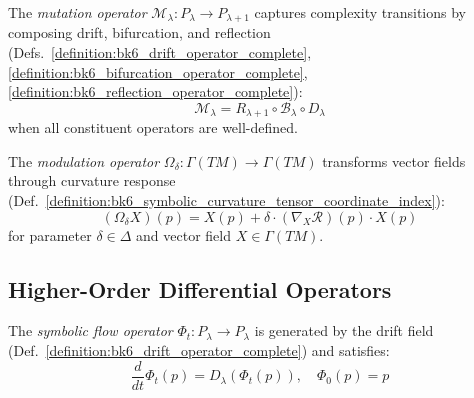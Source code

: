 \begin{definition}
\label{definition:bk6_mutation_operator_complete}
The \emph{mutation operator} $\mathcal{M}_{\lambda} : P_{\lambda} \to P_{\lambda+1}$ captures complexity transitions by composing drift, bifurcation, and reflection (Defs.~\ref{definition:bk6_drift_operator_complete}, \ref{definition:bk6_bifurcation_operator_complete}, \ref{definition:bk6_reflection_operator_complete}):
\begin{equation}
\mathcal{M}_{\lambda} = R_{\lambda+1} \circ \mathcal{B}_{\lambda} \circ D_{\lambda}
\end{equation}
when all constituent operators are well-defined.
\end{definition}

\begin{definition}
\label{definition:bk6_modulation_operator_complete}
The \emph{modulation operator} $\Omega_\delta : \Gamma(TM) \to \Gamma(TM)$ transforms vector fields through curvature response (Def.~\ref{definition:bk6_symbolic_curvature_tensor_coordinate_index}):
\begin{equation}
(\Omega_\delta X)(p) = X(p) + \delta \cdot (\nabla_X \mathcal{R})(p) \cdot X(p)
\end{equation}
for parameter $\delta \in \Delta$ and vector field $X \in \Gamma(TM)$.
\end{definition}

\subsection{Higher-Order Differential Operators}
\label{subsec:bk6_higher_order_differential_operators}

\begin{definition}
\label{definition:bk6_symbolic_flow_operator_complete}
The \emph{symbolic flow operator} $\Phi_t : P_\lambda \to P_\lambda$ is generated by the drift field (Def.~\ref{definition:bk6_drift_operator_complete}) and satisfies:
\begin{equation}
\frac{d}{dt}\Phi_t(p) = D_\lambda(\Phi_t(p)), \quad \Phi_0(p) = p
\end{equation}
\end{definition}

